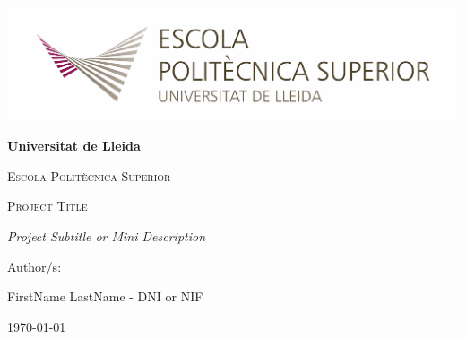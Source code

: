 \begin{titlepage}
		\centering
		{\includegraphics[width=1\textwidth]{images/logo.jpg}\par}
		\vspace{1cm}
		{\bfseries\LARGE Universitat de Lleida \par}
		\vspace{1cm}
		{\scshape\Large Escola Polit\`ecnica Superior \par}
		\vspace{3cm}
		{\scshape\Huge Project Title \par}
		\vspace{3cm}
		{\itshape\Large Project Subtitle or Mini Description \par}
		\vfill
		{\Large Author/s: \par}
		{\Large FirstName LastName - DNI or NIF \par}
		\vfill
		{\Large \today \par}
\end{titlepage}